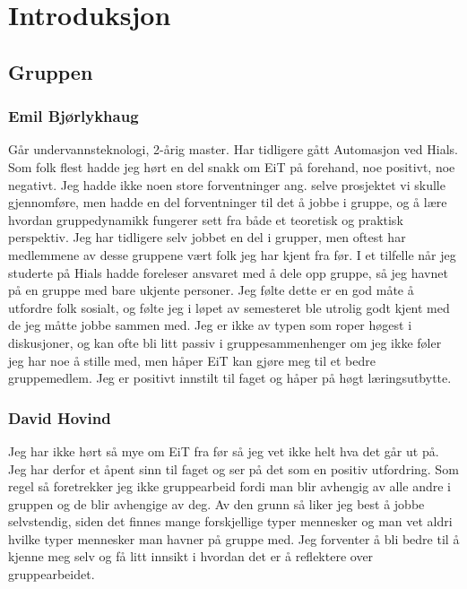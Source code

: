 \chapter{Introduksjon}
\section{Gruppen} 
\subsection{Emil Bjørlykhaug}
Går undervannsteknologi, 2-årig master. Har tidligere gått Automasjon ved Hials.
Som folk flest hadde jeg hørt en del snakk om EiT på forehand, noe positivt, noe negativt. 
Jeg hadde ikke noen store forventninger ang. selve prosjektet vi skulle gjennomføre,
 men hadde en del forventninger til det å jobbe i gruppe, og å lære hvordan gruppedynamikk 
fungerer sett fra både et teoretisk og praktisk perspektiv. Jeg har tidligere selv jobbet 
en del i grupper, men oftest har medlemmene av desse gruppene vært folk jeg har kjent 
fra før. I et tilfelle når jeg studerte på Hials hadde foreleser ansvaret med å dele opp gruppe, 
så jeg havnet på en gruppe med bare ukjente personer. Jeg følte dette er en god måte å 
utfordre folk sosialt, og følte jeg i løpet av semesteret ble utrolig godt kjent med de jeg 
måtte jobbe sammen med.
Jeg er ikke av typen som roper høgest i diskusjoner, og kan ofte bli litt passiv i 
gruppesammenhenger om jeg ikke føler jeg har noe å stille med, men håper 
EiT kan gjøre meg til et bedre gruppemedlem. Jeg er positivt innstilt til faget 
og håper på høgt læringsutbytte.

\subsection{David Hovind} Jeg har ikke hørt så mye om EiT fra før så jeg vet ikke helt hva det går ut på. 
Jeg har derfor et åpent sinn til faget og ser på det som en positiv utfordring. 
Som regel så foretrekker jeg ikke gruppearbeid fordi man blir avhengig av alle andre i gruppen og de blir avhengige av deg. 
Av den grunn så liker jeg best å jobbe selvstendig, siden det finnes mange forskjellige typer mennesker og man vet aldri 
hvilke typer mennesker man havner på gruppe med. Jeg forventer å bli bedre til å kjenne meg selv og få litt innsikt i 
hvordan det er å reflektere over gruppearbeidet.

